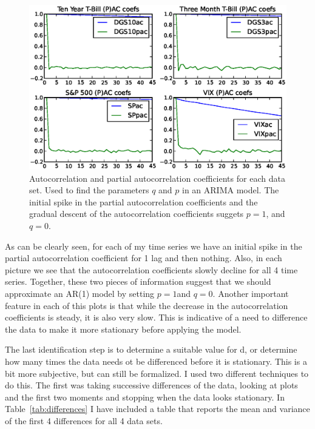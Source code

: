 \documentclass[a4paper, 11pt]{article}
\theoremstyle{definition} %
\numberwithin{equation}{section}
\begin{document}
      \begin{figure}[!h]
        \centering
        \includegraphics[width=6in]{./Figures/all_corrs.eps}
        \captionsetup{width=5.5in}
        \caption{\small Autocorrelation and partial autocorrelation coefficients for each data set. Used to find the parameters $q$ and $p$ in an ARIMA model. The initial spike in the partial autocorrelation coefficients and the gradual descent of the autocorrelation coefficients suggets $p=1$, and $q=0$.}
        \label{fig:correlations}
      \end{figure}

      As can be clearly seen, for each of my time series we have an initial spike in the partial autocorrelation coefficient for 1 lag and then nothing. Also, in each picture we see that the autocorrelation coefficients slowly decline for all 4 time series. Together, these two pieces of information suggest that we should approximate an AR(1) model by setting $p = 1 $and $q = 0$. Another important feature in each of this plots is that while the decrease in the autocorrelation coefficients is steady, it is also very slow. This is indicative of a need to difference the data to make it more stationary before applying the model.

      The last identification step is to determine a suitable value for d, or determine how many times the data needs ot be differenced before it is stationary. This is a bit more subjective, but can still be formalized. I used two different techniques to do this. The first was taking successive differences of the data, looking at plots and the first two moments and stopping when the data looks stationary.  In Table~\ref{tab:differences} I have included a table that reports the mean and variance of the first 4 differences for all 4 data sets.
\end{document}
